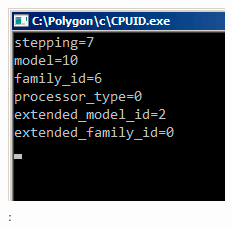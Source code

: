 \begin{figure}[H]
\centering
\includegraphics[scale=\NormalScale]{patterns/15_structs/6_bitfields/cpuid/result.png}
\caption{\olly: }
\label{fig:cpuid_olly_2}
\end{figure}
